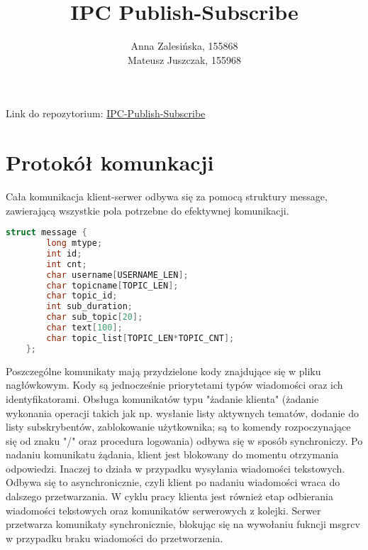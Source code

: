\documentclass{article}
\begin{document}
	\title{IPC Publish-Subscribe}
	\author{Anna Zalesińska, 155868 \\ Mateusz Juszczak, 155968}
	\date{}
	\maketitle
	Link do repozytorium: \href{https://github.com/kashel-mp3/IPC-Publish-Subscribe}{IPC-Publish-Subscribe}
	\section{Protokół komunkacji}
	Cała komunikacja klient-serwer odbywa się za pomocą struktury message, zawierającą wszystkie pola potrzebne do efektywnej komunikacji.
	\begin{lstlisting}[language=c]
	struct message {
		long mtype;
		int id;
		int cnt;
		char username[USERNAME_LEN];
		char topicname[TOPIC_LEN];
		char topic_id;
		int sub_duration;
		char sub_topic[20];
		char text[100];
		char topic_list[TOPIC_LEN*TOPIC_CNT];
	};
	\end{lstlisting}
	Poszczególne komunikaty mają przydzielone kody znajdujące się w pliku nagłówkowym. Kody są jednocześnie priorytetami typów wiadomości oraz ich identyfikatorami. Obsługa komunikatów typu "żadanie klienta" (żadanie wykonania operacji takich jak np. wysłanie listy aktywnych tematów, dodanie do listy subskrybentów, zablokowanie użytkownika; są to komendy rozpoczynające się od znaku "/" oraz procedura logowania) odbywa się w sposób synchroniczy. Po nadaniu komunikatu żądania, klient jest blokowany do momentu otrzymania odpowiedzi. Inaczej to działa w przypadku wysyłania wiadomości tekstowych. Odbywa się to asynchronicznie, czyli klient po nadaniu wiadomości wraca do dalszego przetwarzania. W cyklu pracy klienta jest również etap odbierania wiadomości tekstowych oraz komunikatów serwerowych z kolejki. Serwer przetwarza komunikaty synchronicznie, blokując się na wywołaniu fukncji msgrcv w przypadku braku wiadomości do przetworzenia.
	\newpage
\end{document}
